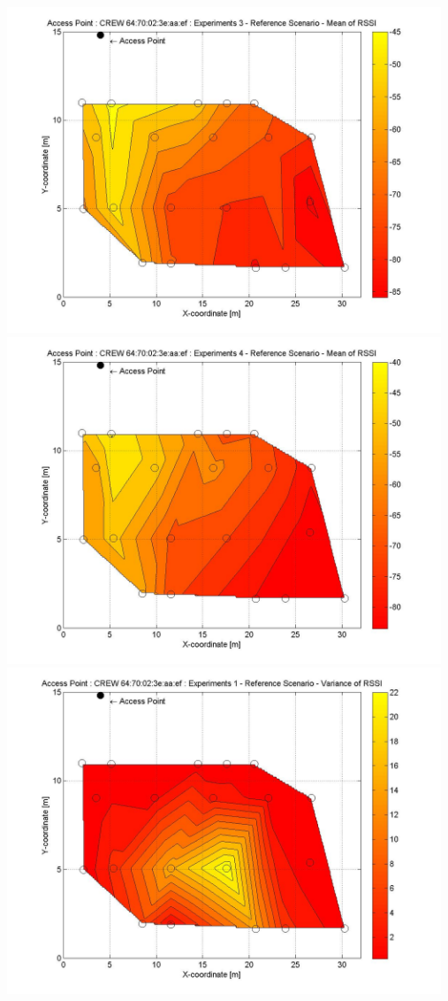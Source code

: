 \documentclass[11pt,a4paper,headinclude,footinclude,chapterprefix=on]{scrreprt}
\begin{document}
\begin{longtable}
	\includegraphics[width=13cm]{../../Source/plot/CREW_ef/ef_Ref_Ex_3_Mean.jpg} \\
	\includegraphics[width=13cm]{../../Source/plot/CREW_ef/ef_Ref_Ex_4_Mean.jpg} \\
	\includegraphics[width=13cm]{../../Source/plot/CREW_ef/ef_Ref_Ex_1_Variance.jpg} \\

\end{longtable}
\end{document}
